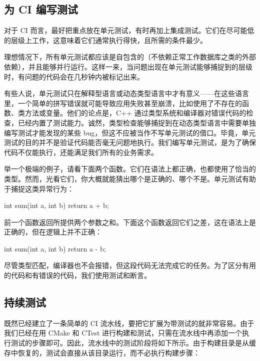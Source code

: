 \subsection{为 CI 编写测试}

\label{idx:932}
对于 CI 而言，最好把重点放在单元测试，有时再加上集成测试。它们在尽可能低的层级上工作，这意味着它们通常执行得快，且所需的条件最少。

理想情况下，所有单元测试都应该是自包含的（不依赖正常工作数据库之类的外部依赖），并且能够并行运行。这样一来，当问题出现在单元测试能够捕捉到的层级时，有问题的代码会在几秒钟内被标记出来。

有些人说，单元测试只在解释型语言或动态类型语言中才有意义——在这些语言里，一个简单的拼写错误就可能导致应用失败甚至崩溃，比如使用了不存在的函数、类方法或变量。他们的论点是，C++ 通过类型系统和编译器对错误代码的检查，已经内置了测试能力。诚然，类型检查能够捕捉到在动态类型语言中需要单独编写测试才能发现的某些 bug，但这不应被当作不写单元测试的借口。毕竟，单元测试的目的并不是验证代码能否毫无问题地执行。我们编写单元测试，是为了确保代码不仅能执行，还能满足我们所有的业务需求。

举一个极端的例子，请看下面两个函数。它们在语法上都正确，也都使用了恰当的类型。然而，光看它们，你大概就能猜出哪个是正确的、哪个不是。单元测试有助于捕捉这类异常行为：

\begin{codebox}[text]
int sum(int a, int b) {
 return a + b;
}
\end{codebox}

前一个函数返回所提供两个参数之和。下面这个函数返回它们之差，这在语法上是正确的，但在逻辑上并不正确：

\begin{codebox}[text]
int sum(int a, int b) {
  return a - b;
}
\end{codebox}

尽管类型匹配，编译器也不会报错，但这段代码无法完成它的任务。为了区分有用的代码和有错误的代码，我们使用测试和断言。

\subsection{持续测试}

\label{idx:933}
\label{idx:934}
既然已经建立了一条简单的 CI 流水线，要把它扩展为带测试的就非常容易。由于我们已经在用 CMake 和 CTest 进行构建和测试，只需在流水线中再添加一个执行测试的步骤即可。因此，流水线中的测试阶段将如下所示。由于构建目录是从缓存中恢复的，测试会直接从该目录运行，而不必执行构建步骤：

